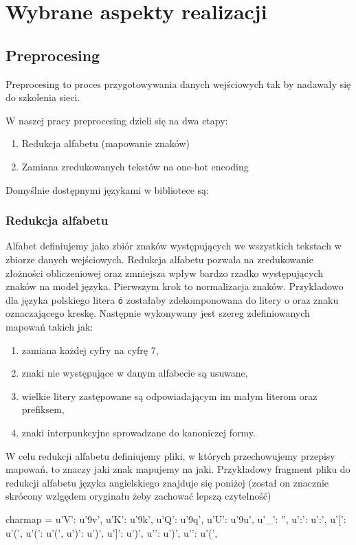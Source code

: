 \newpage
\section{Wybrane aspekty realizacji}

\subsection{Preprocesing}
Preprocesing to proces przygotowywania danych wejściowych tak by nadawały się do szkolenia sieci.

W naszej pracy preprocesing dzieli się na dwa etapy:
\begin{enumerate}
	\item Redukcja alfabetu (mapowanie znaków)
	\item Zamiana zredukowanych tekstów na one-hot encoding
\end{enumerate}

Domyślnie dostępnymi językami w bibliotece są:
\languages 
 

\subsubsection{Redukcja alfabetu}
Alfabet definiujemy jako zbiór znaków występujących we wszystkich tekstach w zbiorze danych wejściowych. 
Redukcja alfabetu pozwala na zredukowanie złożności obliczeniowej oraz zmniejsza wpływ bardzo rzadko
występujących znaków na model języka. Pierwszym krok to normalizacja znaków. 
Przykładowo dla języka polskiego litera \texttt{ó} zostałaby zdekomponowana do litery o oraz znaku oznaczającego kreskę.
Następnie wykonywany jest szereg zdefiniowanych mapowań takich jak:
\begin{enumerate}
  \item zamiana każdej cyfry na cyfrę 7,
  \item znaki nie występujące w danym alfabecie są usuwane,
  \item wielkie litery zastępowane są odpowiadającym im małym literom oraz prefiksem,
  \item znaki interpunkcyjne sprowadzane do kanoniczej formy.
\end{enumerate}
\newpage
W celu redukcji alfabetu definiujemy pliki, w których przechowujemy przepisy mapowań, to znaczy
jaki znak mapujemy na jaki. Przykładowy fragment pliku do redukcji alfabetu języka
angielskiego znajduje się poniżej (został on znacznie skrócony wzlgędem oryginału żeby zachować lepszą
czytelność)

\begin{python}
charmap = {
    u'V': u'\xb9v',     
    u'K': u'\xb9k',         
    u'Q': u'\xb9q',        
    u'U': u'\xb9u',   
    u'_': '',             
    u':': u':',             
    u'[': u'(',           
    u'(': u'(',               
    u')': u')',              
    u']': u')',              
    u'}': u')',              
    u'{': u'(',                 
}
\end{python}

